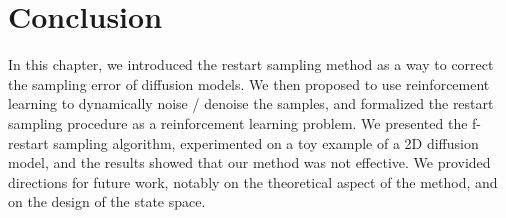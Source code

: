 \section{Conclusion}\label{sec:rl:conclusion}
In this chapter, we introduced the restart sampling method as a way to correct the sampling error of diffusion models. We then proposed to use reinforcement learning to dynamically noise / denoise the samples, and formalized the restart sampling procedure as a reinforcement learning problem. We presented the f-restart sampling algorithm, experimented on a toy example of a 2D diffusion model, and the results showed that our method was not effective. We provided directions for future work, notably on the theoretical aspect of the method, and on the design of the state space.

